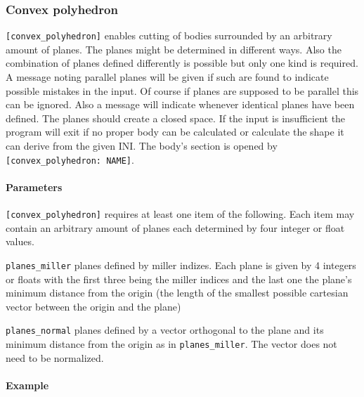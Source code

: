 \subsubsection{Convex polyhedron}

\lstinline{[convex_polyhedron]} enables cutting of bodies surrounded by an arbitrary amount of planes. The planes might be determined in different ways. Also the combination of planes defined differently is possible but only one kind is required. A message noting parallel planes will be given if such are found to indicate possible mistakes in the input. Of course if planes are supposed to be parallel this can be ignored. Also a message will indicate whenever identical planes have been defined. The planes should create a closed space. If the input is insufficient the program will exit if no proper body can be calculated or calculate the shape it can derive from the given INI.
The body's section is opened by \lstinline{[convex_polyhedron: NAME]}.

\paragraph{Parameters}
\lstinline{[convex_polyhedron]} requires at least one item of the following. Each item may contain an arbitrary amount of planes each determined by four integer or float values.
\begin{description}
 \item{\lstinline{planes_miller}} planes defined by miller indizes. Each plane is given by 4 integers or floats with the first three being the miller indices and the last one the plane's minimum distance from the origin (the length of the smallest possible cartesian vector between the origin and the plane)
 \item{\lstinline{planes_normal}} planes defined by a vector orthogonal to the plane and its minimum distance from the origin as in \lstinline{planes_miller}. The vector does not need to be normalized.
\end{description} 

\paragraph{Example}\

